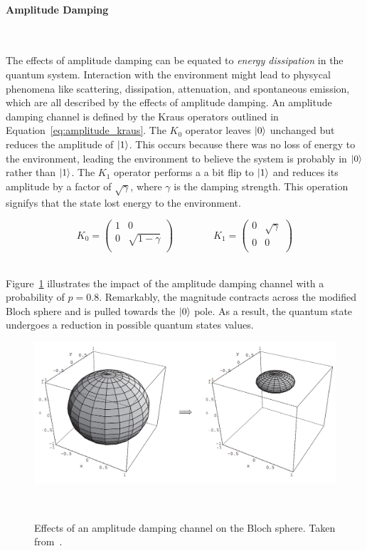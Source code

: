 \paragraph{Amplitude Damping} \

The effects of amplitude damping can be equated to
\textit{energy dissipation} in the quantum system. Interaction with
the environment might lead to physycal phenomena like scattering,
dissipation, attenuation, and spontaneous emission, which are all
described by the effects of amplitude damping. An amplitude
damping channel is defined by the Kraus operators outlined in
Equation~\ref{eq:amplitude_kraus}. The \(K_0\) operator leaves
\(\ket{0}\) unchanged but reduces the amplitude of \(\ket{1}\).
This occurs because there was no loss of energy to the environment,
leading the environment to believe the system is probably in \(\ket{0}\)
rather than \(\ket{1}\). The \(K_1\) operator performs a a bit
flip to \(\ket{1}\) and reduces its amplitude by a factor of
\(\sqrt{\gamma}\), where \(\gamma\) is the damping strength.
This operation signifys that the state lost energy to the
environment. \

\begin{equation}\label{eq:amplitude_kraus}
  K_0 = \begin{pmatrix}
          1 & 0 \\
          0 & \sqrt{1-\gamma} \\
        \end{pmatrix} \qquad \qquad
  K_1 = \begin{pmatrix}
          0 & \sqrt{\gamma} \\
          0 & 0 \\
        \end{pmatrix}
\end{equation} \

Figure~\ref{fig:amplitude_damping} illustrates the impact of the
amplitude damping channel with a probability of \(p=0.8\). Remarkably,
the magnitude contracts across the modified Bloch sphere and is pulled
towards the \(\ket{0}\) pole. As a result, the quantum state undergoes
a reduction in possible quantum states values. \

\begin{figure}[h!]
  \includegraphics[scale=0.39]{figures/amplitude_damping.png}
  \centering
  \caption{Effects of an amplitude damping channel on the Bloch sphere. Taken from~\cite{nielsen_quantum_2010}.}
~\label{fig:amplitude_damping}
\end{figure} \

